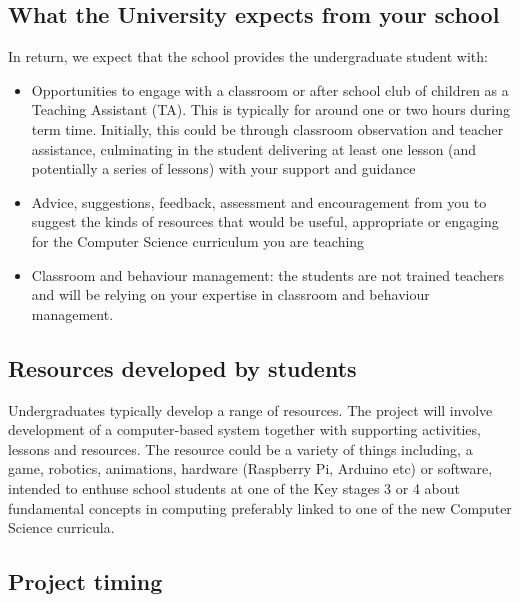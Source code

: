 \documentclass[
  12pt,
]{book}
\providecommand{\tightlist}{%
  \setlength{\itemsep}{0pt}\setlength{\parskip}{0pt}}
\begin{document}
\hypertarget{what-the-university-expects-from-your-school}{%
\subsection{What the University expects from your school}\label{what-the-university-expects-from-your-school}}

In return, we expect that the school provides the undergraduate student with:

\begin{itemize}
\tightlist
\item
  Opportunities to engage with a classroom or after school club of children as a Teaching Assistant (TA). This is typically for around one or two hours during term time. Initially, this could be through classroom observation and teacher assistance, culminating in the student delivering at least one lesson (and potentially a series of lessons) with your support and guidance
\item
  Advice, suggestions, feedback, assessment and encouragement from you to suggest the kinds of resources that would be useful, appropriate or engaging for the Computer Science curriculum you are teaching
\item
  Classroom and behaviour management: the students are not trained teachers and will be relying on your expertise in classroom and behaviour management.
\end{itemize}

\hypertarget{resources-developed-by-students}{%
\subsection{Resources developed by students}\label{resources-developed-by-students}}

Undergraduates typically develop a range of resources. The project will involve development of a computer-based system together with supporting activities, lessons and resources. The resource could be a variety of things including, a game, robotics, animations, hardware (Raspberry Pi, Arduino etc) or software, intended to enthuse school students at one of the Key stages 3 or 4 about fundamental concepts in computing preferably linked to one of the new Computer Science curricula.

\hypertarget{project-timing}{%
\subsection{Project timing}\label{project-timing}}
\end{document}
